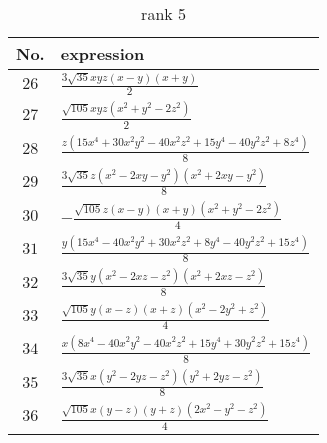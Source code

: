 \documentclass[fleqn,8pt,landscape]{jsarticle}
\begin{document}
\begin{table}[ht!]
\begin{center}
\caption{rank 5}
\renewcommand{\arraystretch}{1.3}
\begin{tabular}{cl} \hline \hline
No. & expression \\ \hline
$ 26 $ & $ \frac{3 \sqrt{35} x y z \left(x - y\right) \left(x + y\right)}{2} $ \\
$ 27 $ & $ \frac{\sqrt{105} x y z \left(x^{2} + y^{2} - 2 z^{2}\right)}{2} $ \\
$ 28 $ & $ \frac{z \left(15 x^{4} + 30 x^{2} y^{2} - 40 x^{2} z^{2} + 15 y^{4} - 40 y^{2} z^{2} + 8 z^{4}\right)}{8} $ \\
$ 29 $ & $ \frac{3 \sqrt{35} z \left(x^{2} - 2 x y - y^{2}\right) \left(x^{2} + 2 x y - y^{2}\right)}{8} $ \\
$ 30 $ & $ - \frac{\sqrt{105} z \left(x - y\right) \left(x + y\right) \left(x^{2} + y^{2} - 2 z^{2}\right)}{4} $ \\
$ 31 $ & $ \frac{y \left(15 x^{4} - 40 x^{2} y^{2} + 30 x^{2} z^{2} + 8 y^{4} - 40 y^{2} z^{2} + 15 z^{4}\right)}{8} $ \\
$ 32 $ & $ \frac{3 \sqrt{35} y \left(x^{2} - 2 x z - z^{2}\right) \left(x^{2} + 2 x z - z^{2}\right)}{8} $ \\
$ 33 $ & $ \frac{\sqrt{105} y \left(x - z\right) \left(x + z\right) \left(x^{2} - 2 y^{2} + z^{2}\right)}{4} $ \\
$ 34 $ & $ \frac{x \left(8 x^{4} - 40 x^{2} y^{2} - 40 x^{2} z^{2} + 15 y^{4} + 30 y^{2} z^{2} + 15 z^{4}\right)}{8} $ \\
$ 35 $ & $ \frac{3 \sqrt{35} x \left(y^{2} - 2 y z - z^{2}\right) \left(y^{2} + 2 y z - z^{2}\right)}{8} $ \\
$ 36 $ & $ \frac{\sqrt{105} x \left(y - z\right) \left(y + z\right) \left(2 x^{2} - y^{2} - z^{2}\right)}{4} $ \\
 \hline \hline
\end{tabular}
\end{center}
\end{table}
\end{document}
